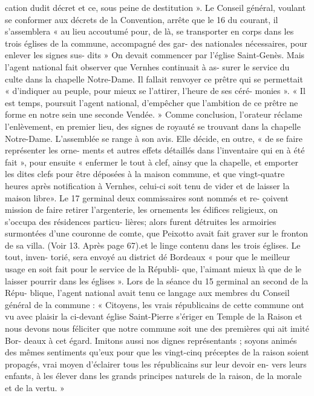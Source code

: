 \documentclass[a4paper,11pt]{book}
\begin{document}
cation dudit décret et ce, sous peine de destitution ».
Le Conseil général, voulant se conformer aux décrets de
la Convention, arrête que le 16 du courant, il s'assemblera
« au lieu accoutumé pour, de là, se transporter en corps
dans les trois églises de la commune, accompagné des gar-
des nationales nécessaires, pour enlever les signes sus-
dits »
On devait commencer par l'église Saint-Genès. Mais
l'agent national fait observer que Vernhes continuait à as-
surer le service du culte dans la chapelle Notre-Dame. Il
fallait renvoyer ce prêtre qui se permettait « d'indiquer
au peuple, pour mieux se l'attirer, l'heure de ses céré-
monies ».
« Il est temps, poursuit l'agent national, d'empêcher que
l'ambition de ce prêtre ne forme en notre sein une seconde
Vendée. »
Comme conclusion, l'orateur réclame l'enlèvement, en
premier lieu, des signes de royauté se trouvant dans la
chapelle Notre-Dame. L'assemblée se range à son avis.
Elle décide, en outre, « de se faire représenter les orne-
ments et autres effets détaillés dans l'inventaire qui en à
été fait », pour ensuite « enfermer le tout à clef, ainsy que
la chapelle, et emporter les dites clefs pour être déposées
à la maison commune, et que vingt-quatre heures après
notification à Vernhes, celui-ci soit tenu de vider et de
laisser la maison libre».
Le 17 germinal deux commissaires sont nommés et re-
çoivent mission de faire retirer l'argenterie, les ornements
les édifices religieux, on s'occupa des résidences particu-
lières; alors furent détruites les armoiries surmontées d'une couronne
de comte, que Peixotto avait fait graver sur le fronton de sa villa. (Voir
13. Après
page 67).et le linge contenu dans les trois églises. Le tout, inven-
torié, sera envoyé au district dé Bordeaux « pour que le
meilleur usage en soit fait pour le service de la Républi-
que, l'aimant mieux là que de le laisser pourrir dans les
églises ».
Lors de la séance du 15 germinal an second de la Répu-
blique, l'agent national avait tenu ce langage aux membres
du Conseil général de la commune :
« Citoyens, les vrais républicains de cette commune ont
vu avec plaisir la ci-devant église Saint-Pierre s'ériger en
Temple de la Raison et nous devons nous féliciter que
notre commune soit une des premières qui ait imité Bor-
deaux à cet égard. Imitons aussi nos dignes représentants ;
soyons animés des mêmes sentiments qu'eux pour que les
vingt-cinq préceptes de la raison soient propagés, vrai
moyen d'éclairer tous les républicains sur leur devoir en-
vers leurs enfants, à les élever dans les grands principes
naturels de la raison, de la morale et de la vertu. »
\end{document}
